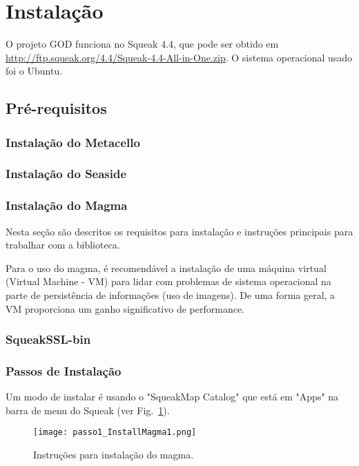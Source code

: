 \section{Instalação}

O projeto GOD funciona no Squeak 4.4, que pode ser obtido em \url{http://ftp.squeak.org/4.4/Squeak-4.4-All-in-One.zip}. 
O sistema operacional usado foi o Ubuntu. 

\subsection{Pré-requisitos}

\subsubsection{Instalação do Metacello}


\subsubsection{Instalação do Seaside}


\subsubsection{Instalação do Magma}
Nesta seção são descritos os requisitos para instalação e instruções principais para trabalhar com a biblioteca.

Para o uso do magma, é recomendável a instalação de uma máquina virtual (Virtual Machine - VM) para lidar com problemas de sistema operacional na parte de persistência de informações (uso de imagens). De uma forma geral, a VM proporciona um ganho significativo de performance.


\subsubsection{SqueakSSL-bin}



\subsubsection{Passos de Instalação}

Um modo de instalar é usando o "SqueakMap Catalog" que está em "Apps" na barra de menu do Squeak (ver Fig.~\ref{fig:passo1_InstallMagma1}).

\begin{figure}[!htb]
\centering
\texttt{[image: passo1\_InstallMagma1.png]}
\caption{Instruções para instalação do magma.}
\label{fig:passo1_InstallMagma1}
\end{figure}

